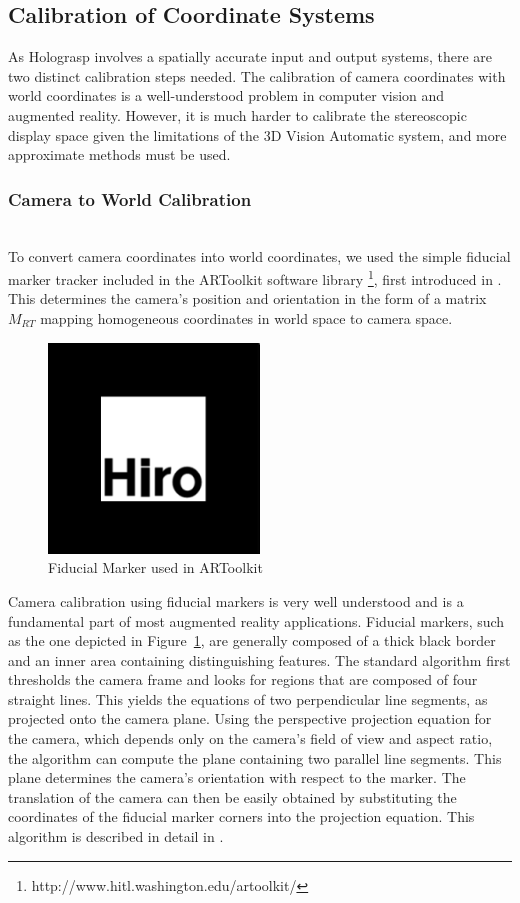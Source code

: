\documentclass[pageno]{jpaper}
\begin{document}
\subsection{Calibration of Coordinate Systems}
As Holograsp involves a spatially accurate input and output systems, there are two distinct calibration steps needed. The calibration
of camera coordinates with world coordinates is a well-understood problem in computer vision and augmented reality. 
However, it is much harder to calibrate the stereoscopic display space given the limitations of the 3D Vision Automatic
system, and more approximate methods must be used.
\subsubsection{Camera to World Calibration}$ $\\
To convert camera coordinates into world coordinates, we used the simple fiducial marker tracker included in the ARToolkit software
library \footnote{http://www.hitl.washington.edu/artoolkit/}, first introduced in \cite{artoolkit}. This determines the camera's position
and orientation in the form of a matrix $M_{RT}$ mapping homogeneous coordinates in world space to camera space.

\begin{figure}
\centering
\includegraphics[width=0.5\textwidth]{figures/hiro.png}
\caption{Fiducial Marker used in ARToolkit}
\label{fig:hiro}
\end{figure}

Camera calibration using fiducial markers is very well understood and is a fundamental part of most augmented reality applications. Fiducial
markers, such as the one depicted in Figure~\ref{fig:hiro}, are generally composed of a thick black border and an inner area 
containing distinguishing features. The standard algorithm first thresholds the camera frame and looks for regions that are composed of four straight lines.
This yields the equations of two perpendicular line segments, as projected onto the camera plane. Using the perspective projection equation 
for the camera, which depends only on the camera's field of view and aspect ratio, the algorithm can compute the plane containing two
parallel line segments. This plane determines the camera's orientation with respect to the marker. The translation of the camera can then be
easily obtained by substituting the coordinates of the fiducial marker corners into the projection equation. This algorithm is described in
detail in \cite{kato1999marker}.
\end{document}
